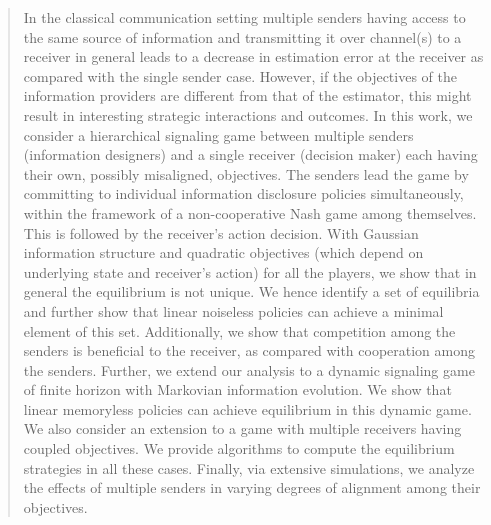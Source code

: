 \documentclass[12pt,journal,onecolumn]{IEEEtran}
\begin{document}
\begin{abstract}
In the classical communication setting multiple senders having access to the same source of information and transmitting it over channel(s) to a receiver in general leads to a decrease in estimation error at the receiver as compared with the single sender case. However, if the objectives of the information providers are different from that of the estimator, this might result in interesting strategic interactions and outcomes. In this work, we consider a hierarchical signaling game between multiple senders (information designers) and a single receiver (decision maker) each having their own, possibly misaligned, objectives. The senders lead the game by committing to individual information disclosure policies simultaneously, within the framework of a non-cooperative Nash game among themselves. This is followed by the receiver's action decision.
With Gaussian information structure and quadratic objectives (which depend on underlying state and receiver's action) for all the players, we show that in general the equilibrium is not unique. We hence identify a set of equilibria and further show that linear noiseless policies can achieve a minimal element of this set. %
Additionally, we show that competition among the senders is beneficial to the receiver, as compared with cooperation among the senders. Further, we extend our analysis to a dynamic signaling game of finite horizon with Markovian information evolution. We show that linear memoryless policies can achieve equilibrium in this dynamic game. We also consider an extension to a game with multiple receivers having coupled objectives.
We provide algorithms to compute the equilibrium strategies in all these cases. Finally, via extensive simulations, we analyze the effects of multiple senders in varying degrees of alignment among their objectives.

\end{abstract}
\end{document}

